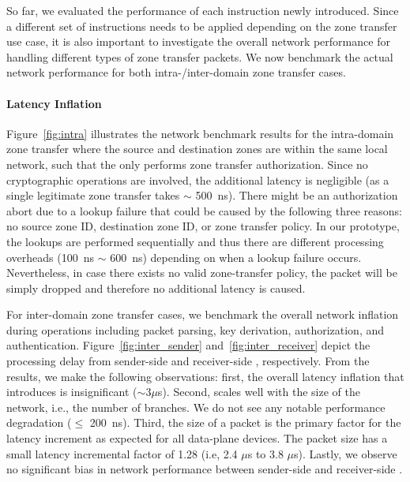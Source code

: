So far, we evaluated the performance of each instruction newly introduced. Since a different
set of instructions needs to be applied depending on the zone transfer use case, it is also
important to investigate the overall network performance for handling different types of zone
transfer packets. We now benchmark the actual network performance for both intra-/inter-domain
zone transfer cases.

\paragraph{Latency Inflation}
Figure~\ref{fig:intra} illustrates the network benchmark results for the intra-domain zone
transfer where the source and destination zones are within the same local network, such that
the \tp only performs zone transfer authorization. Since no cryptographic operations are involved,
the additional latency is negligible (as a single legitimate zone transfer takes $\sim$
\SI{500}{ns}). There might be an authorization abort due to a lookup failure that could be
caused by the following three reasons: no source zone ID, destination zone ID, or
zone transfer policy. In our prototype, the lookups are performed sequentially and thus
there are different processing overheads (\SI{100}{ns} $\sim$ \SI{600}{ns}) depending on when a
lookup failure occurs. Nevertheless, in case there exists no valid zone-transfer policy, the
packet will be simply dropped and therefore no additional latency is caused.

For inter-domain zone transfer cases, we benchmark the overall network inflation during \tp
operations including packet parsing, key derivation, authorization, and authentication.
Figure~\ref{fig:inter_sender} and~\ref{fig:inter_receiver} depict the processing delay from
sender-side \tp and receiver-side \tp, respectively.
From the results, we make the following observations: first, the overall latency inflation that
\name introduces is insignificant ($\sim 3 \mu$s). Second, \name scales well with the size of the
network, i.e., the number of branches. We do not see any notable performance degradation
($\leq$ \SI{200}{ns}). Third, the size of a packet is the primary factor for the latency increment
as expected for all data-plane devices. The packet size has a small latency incremental factor of
1.28 (i.e, 2.4 $\mu$s to 3.8 $\mu$s). Lastly, we observe no significant bias in network
performance between sender-side and receiver-side \tps.


